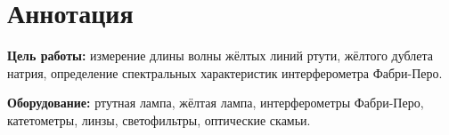 \section{Аннотация}
\textbf{Цель работы:}
измерение длины волны жёлтых линий ртути, жёлтого дублета натрия, определение спектральных характеристик интерферометра Фабри-Перо.

\textbf{Оборудование:}
ртутная лампа, жёлтая лампа, интерферометры Фабри-Перо, катетометры, линзы, светофильтры, оптические скамьи.
